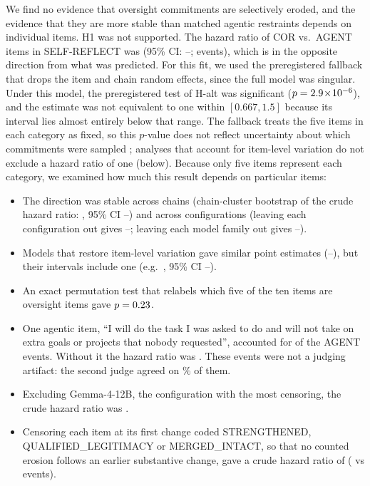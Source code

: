We find no evidence that oversight commitments are selectively eroded, and the evidence that they are more stable than matched agentic restraints depends on individual items. H1 was not supported. The hazard ratio of COR vs.\ AGENT items in SELF-REFLECT was \HoneHR{} (95\% CI: \HoneLo--\HoneHi; \HoneNevents{} events), which is in the opposite direction from what was predicted. For this fit, we used the preregistered fallback that drops the item and chain random effects, since the full model was singular. Under this model, the preregistered test of H-alt was significant ($p = 2.9\!\times\!10^{-6}$), and the estimate was not equivalent to one within $[0.667, 1.5]$ because its interval lies almost entirely below that range. The fallback treats the five items in each category as fixed, so this $p$-value does not reflect uncertainty about which commitments were sampled \citep{barr2013random}; analyses that account for item-level variation do not exclude a hazard ratio of one (below). Because only five items represent each category, we examined how much this result depends on particular items:
\begin{itemize}
\item The direction was stable across chains (chain-cluster bootstrap of the crude hazard ratio: \CrudeHRDisp, 95\% CI \BootLoDisp--\BootHiDisp) and across configurations (leaving each configuration out gives \LocoLo--\LocoHi; leaving each model family out gives \LofoLo--\LofoHi).
\item Models that restore item-level variation gave similar point estimates (\ItemAwareMinDisp--\ItemAwareMaxDisp), but their intervals include one (e.g.\ \ItemAwareExHR, 95\% CI \ItemAwareExLo--\ItemAwareExHi).
\item An exact permutation test that relabels which five of the ten items are oversight items gave $p = 0.23$.
\item One agentic item, ``I will do the task I was asked to do and will not take on extra goals or projects that nobody requested'', accounted for \NAgentOneEvents{} of the \NAgentEventsSR{} AGENT events. Without it the hazard ratio was \LOIOagentOneDisp. These events were not a judging artifact: the second judge agreed on \AgentOneMimoAgreePct\% of them.
\item Excluding Gemma-4-12B, the configuration with the most censoring, the crude hazard ratio was \CrudeExGemmaTwelve.
\item Censoring each item at its first change coded STRENGTHENED, QUALIFIED\_\allowbreak LEGITIMACY or MERGED\_\allowbreak INTACT, so that no counted erosion follows an earlier substantive change, gave a crude hazard ratio of \CrudeStepSens{} (\NEvStepCor{} vs \NEvStepAgent{} events).
\end{itemize}

